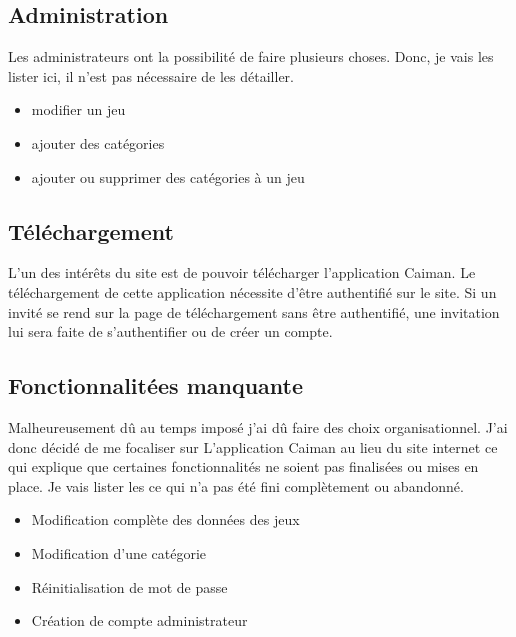 \documentclass[a4paper,12pt,french]{sphinxmanual}
\begin{document}
\sphinxAtStartPar
{}


\subsection{Administration}
\label{\detokenize{fonctionnelle:administration}}
\sphinxAtStartPar
Les administrateurs ont la possibilité de faire plusieurs choses. Donc, je vais les lister ici, il n’est pas nécessaire de les détailler.
\begin{itemize}
\item {} 
\sphinxAtStartPar
modifier un jeu

\item {} 
\sphinxAtStartPar
ajouter des catégories

\item {} 
\sphinxAtStartPar
ajouter ou supprimer des catégories à un jeu

\end{itemize}

\sphinxAtStartPar
{}


\subsection{Téléchargement}
\label{\detokenize{fonctionnelle:telechargement}}
\sphinxAtStartPar
L’un des intérêts du site est de pouvoir télécharger l’application Caiman. Le téléchargement de cette application nécessite d’être authentifié sur le site. Si un invité se rend sur la page de téléchargement sans être authentifié, une invitation lui sera faite de s’authentifier ou de créer un compte.

\sphinxAtStartPar
{}

\sphinxAtStartPar
{}


\subsection{Fonctionnalitées manquante}
\label{\detokenize{fonctionnelle:fonctionnalitees-manquante}}
\sphinxAtStartPar
Malheureusement dû au temps imposé j’ai dû faire des choix organisationnel. J’ai donc décidé de me focaliser sur L’application Caiman au lieu du site internet ce qui explique que certaines fonctionnalités ne soient pas finalisées ou mises en place. Je vais lister les ce qui n’a pas été fini complètement ou abandonné.
\begin{itemize}
\item {} 
\sphinxAtStartPar
Modification complète des données des jeux

\item {} 
\sphinxAtStartPar
Modification d’une catégorie

\item {} 
\sphinxAtStartPar
Réinitialisation de mot de passe

\item {} 
\sphinxAtStartPar
Création de compte administrateur

\end{itemize}
\end{document}

